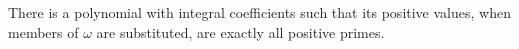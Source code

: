 There is a polynomial with integral coefficients such that its positive values, when members of $\omega$ are substituted, are exactly all positive primes.